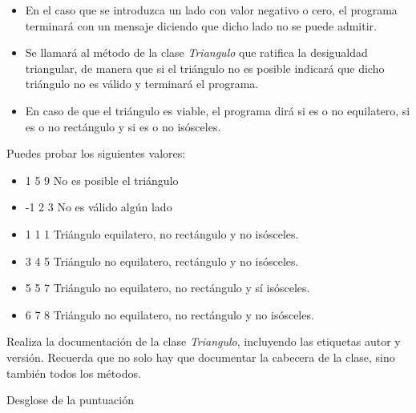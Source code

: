 \documentclass[addpoints,12pt]{exam}
\begin{document}
\begin{questions}
\begin{itemize}
\item En el caso que se introduzca un lado con valor negativo o cero, el programa terminará con un mensaje diciendo que dicho lado no se puede admitir.
\item Se llamará al método de la clase \emph{Triangulo} que ratifica la desigualdad triangular, de manera que si el triángulo no es posible indicará que dicho triángulo no es válido y terminará el programa.
\item En caso de que el triángulo es viable, el programa dirá si es o no equilatero, si es o no rectángulo y si es o no isósceles.
\end{itemize}
\newpage
Puedes probar los siguientes valores:
\begin{itemize}
\item 1 5 9 No es posible el triángulo
\item -1 2 3 No es válido algún lado
\item 1 1 1 Triángulo equilatero, no rectángulo y no isósceles.
\item 3 4 5 Triángulo no equilatero, rectángulo y no isósceles.
\item 5 5 7 Triángulo no equilatero, no rectángulo y sí isósceles.
\item 6 7 8 Triángulo no equilatero, no rectángulo y no isósceles.
\end{itemize}
Realiza la documentación de la clase \emph{Triangulo}, incluyendo las etiquetas autor y versión. Recuerda que no solo hay que documentar la cabecera de la clase, sino también todos los métodos.\par
\vspace{0.5cm}
Desglose de la puntuación
\end{questions}
\end{document}

